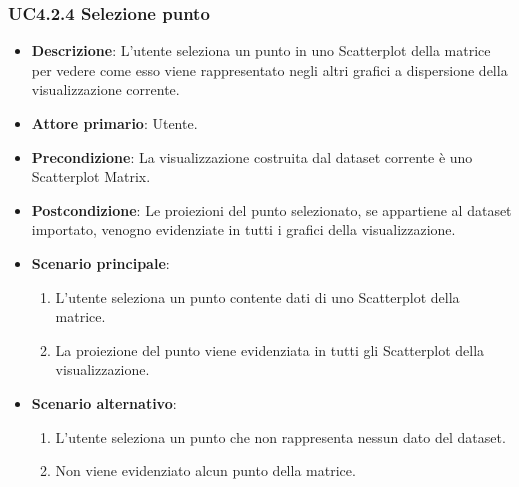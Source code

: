 \subsubsection{UC4.2.4 Selezione punto}
\label{ssub:uc4.2.4}
\begin{itemize}
    \item \textbf{Descrizione}: L'utente seleziona un punto in uno Scatterplot della matrice per vedere come 
                                esso viene rappresentato negli altri grafici a dispersione della visualizzazione corrente.
	
    \item \textbf{Attore primario}: Utente.
    
    \item \textbf{Precondizione}:   La visualizzazione costruita dal dataset corrente è uno Scatterplot Matrix.
    \item \textbf{Postcondizione}:  Le proiezioni del punto selezionato, se appartiene al dataset importato, 
                                    venogno evidenziate in tutti i grafici della visualizzazione.

	\item \textbf{Scenario principale}:
        \begin{enumerate}
            \item L'utente seleziona un punto contente dati di uno Scatterplot della matrice.
            \item La proiezione del punto viene evidenziata in tutti gli Scatterplot della visualizzazione.
        \end{enumerate}

    \item \textbf{Scenario alternativo}:
        \begin{enumerate}
            \item L'utente seleziona un punto che non rappresenta nessun dato del dataset.
            \item Non viene evidenziato alcun punto della matrice.
        \end{enumerate}

\end{itemize}


